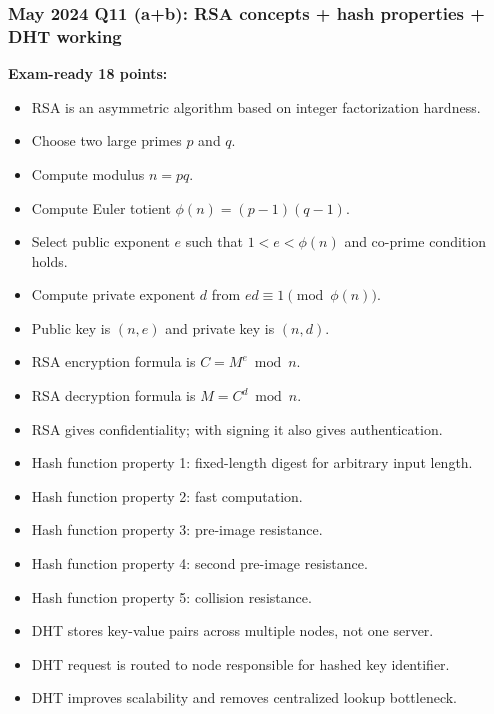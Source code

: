\documentclass[12pt,a4paper]{article}
\begin{document}
\subsubsection*{May 2024 Q11 (a+b): RSA concepts + hash properties + DHT working}
\textbf{Exam-ready 18 points:}
\begin{itemize}
\item RSA is an asymmetric algorithm based on integer factorization hardness.
\item Choose two large primes \(p\) and \(q\).
\item Compute modulus \(n=pq\).
\item Compute Euler totient \(\phi(n)=(p-1)(q-1)\).
\item Select public exponent \(e\) such that \(1<e<\phi(n)\) and co-prime condition holds.
\item Compute private exponent \(d\) from \(ed \equiv 1 \pmod{\phi(n)}\).
\item Public key is \((n,e)\) and private key is \((n,d)\).
\item RSA encryption formula is \(C=M^e \bmod n\).
\item RSA decryption formula is \(M=C^d \bmod n\).
\item RSA gives confidentiality; with signing it also gives authentication.
\item Hash function property 1: fixed-length digest for arbitrary input length.
\item Hash function property 2: fast computation.
\item Hash function property 3: pre-image resistance.
\item Hash function property 4: second pre-image resistance.
\item Hash function property 5: collision resistance.
\item DHT stores key-value pairs across multiple nodes, not one server.
\item DHT request is routed to node responsible for hashed key identifier.
\item DHT improves scalability and removes centralized lookup bottleneck.
\end{itemize}
\end{document}
